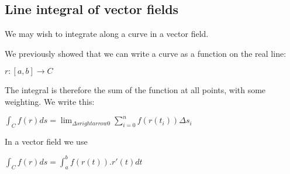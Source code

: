 
\subsection{Line integral of vector fields}

We may wish to integrate along a curve in a vector field.

We previously showed that we can write a curve as a function on the real line:

\(r:[a,b]\rightarrow C\)

The integral is therefore the sum of the function at all points, with some weighting. We write this:

\(\int_C f(r) ds=\lim_{\Delta s rightarrow 0 }\sum_{i=0}^n f(r(t_i))\Delta s_i\)

In a vector field we use

\(\int_C f(r) ds =\int_a^b f(r(t)).r'(t) dt\)

